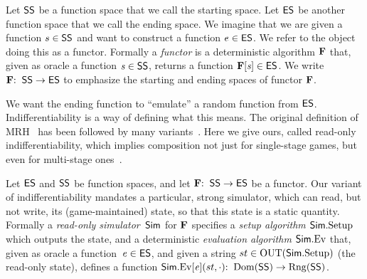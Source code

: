 Let $\mathsf{SS}$ be a function space that we call the starting space. Let $\mathsf{ES}$ be another function space that we call the ending space. We imagine that we are given a function $s\in\mathsf{SS}$ and want to construct a function $e\in\mathsf{ES}$. We refer to the object doing this as a functor. Formally a \textit{functor} is a deterministic algorithm $\mathbf{F}$ that, given as oracle a function $\mathit{s}\in\mathsf{SS}$, returns a function $\mathbf{F}[\mathit{s}]\in\mathsf{ES}$. We write $\mathbf{F}{:\;\;} \mathsf{SS}\to \mathsf{ES}$ to emphasize the starting and ending spaces of functor $\mathbf{F}$. 



 
 

 We want the ending function to ``emulate'' a random function from $\mathsf{ES}$. Indifferentiability is a way of defining what this means. The original definition of MRH~\cite{TCC:MauRenHol04} has been followed by many variants~\cite{C:CDMP05,EC:RisShaShr11,EC:DGHM13,EC:Mittelbach14}. 
Here we give ours, called read-only indifferentiability, which implies composition not just for single-stage games, but even for multi-stage ones~\cite{EC:RisShaShr11,EC:DGHM13,EC:Mittelbach14}. 

Let $\mathsf{ES}$ and $\mathsf{SS}$ be function spaces, and let $\mathbf{F}{:\;\;} \mathsf{SS}\to 
\mathsf{ES}$ be a functor. Our variant of indifferentiability mandates a particular, strong simulator, which can read, but not write, its (game-maintained) state, so that this state is a static quantity. 
Formally a \textit{read-only simulator}~$\mathsf{Sim}$ for
$\mathbf{F}$ specifies a \textit{setup algorithm}  $\mathsf{Sim}.{\mathrm{Setup}}$ which outputs the state, and a  deterministic \textit{evaluation algorithm} $\mathsf{Sim}.{\mathrm{Ev}}$ that, given as oracle a function~$\mathit{e} \in \mathsf{ES}$, and given a string $st \in \mathrm{OUT}(\mathsf{Sim}.{\mathrm{Setup}})$ (the read-only state), defines a function $\mathsf{Sim}.{\mathrm{Ev}}[\mathit{e}](st,\cdot) {:\;\;}\mathrm{Dom}(\mathsf{SS})\to\mathrm{Rng}(\mathsf{SS})$. 

